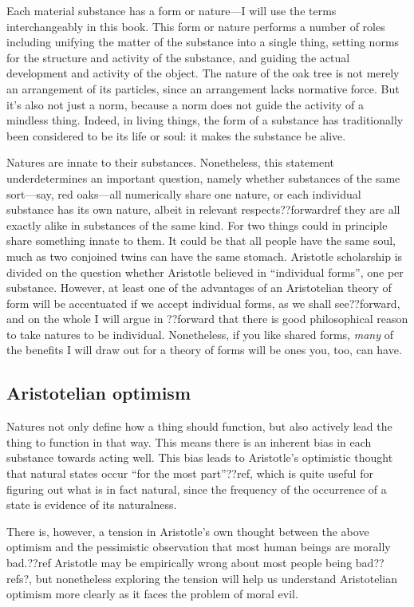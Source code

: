 Each material substance has a form or nature---I will use the terms interchangeably in this book. This form or nature performs a number of roles including unifying the matter of the 
substance into a single thing, setting norms for the structure and activity of the substance, and guiding the actual 
development and activity of the object. The nature of the oak tree is not merely an arrangement of its particles, since an
arrangement lacks normative force. But it's also not just a norm, because a norm does not guide the activity of a mindless
thing. Indeed, in living things, the form of a substance has traditionally been considered to be its life or soul: it makes the substance
be alive. 

Natures are innate to their substances. Nonetheless, this statement underdetermines an important question, namely whether 
substances of the same sort---say, red oaks---all numerically share one nature, or each individual substance has its own nature, 
albeit in relevant respects??forwardref they are all exactly alike in substances of the same kind. For two things could in
principle share something innate to them. It could be that all people have the same soul, much as two conjoined twins can
have the same stomach. Aristotle scholarship is divided on the question whether Aristotle believed in ``individual forms'',
one per substance. However, at least one of the advantages of an Aristotelian theory of form will be accentuated if we accept 
individual forms, as we shall see??forward, and on the whole I will argue in ??forward that there is good
philosophical reason to take natures to be individual.
Nonetheless, if you like shared forms, 
\textit{many} of the benefits I will draw out for a theory of forms will be ones you, too, can have. 

\subsection{Aristotelian optimism}
Natures not only define how a thing should function, but also actively lead the thing to function in that way.
This means there is an inherent bias in each substance towards acting well. This bias leads to Aristotle's
optimistic thought that natural states occur ``for the most part''??ref, which is quite useful for figuring out
what is in fact natural, since the frequency of the occurrence of a state is evidence of its naturalness.

There is, however, a tension in Aristotle's own thought between the above optimism and the pessimistic observation 
that most human beings are morally bad.??ref Aristotle may be empirically wrong about most people being bad??refs?,
but nonetheless exploring the tension will help us understand Aristotelian optimism more clearly as it faces the
problem of moral evil.

